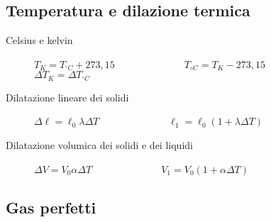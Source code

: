 \documentclass[a4paper,11pt,italian]{article}
\begin{document}
\subsection{Temperatura e dilazione termica}

\begin{description}
  \item[Celsius e kelvin] $ T_K = T_{^{\circ}C} + 273,15 $~~~~~~~~~~~~~~$ T_{{\circ}C} = T_{K} - 273,15 $~~~~~~~~~~~~~~$ \Delta T_K = \Delta T_{^{\circ}C} $
  
  \item[Dilatazione lineare dei solidi] $ \Delta \ell = \ell_0 \lambda \Delta T $~~~~~~~~~~~~~~$ \ell_1 = \ell_0 (1 + \lambda \Delta T) $
  
  \item[Dilatazione volumica dei solidi e dei liquidi] $ \Delta V = V_0 \alpha \Delta T $~~~~~~~~~~~~~~$ V_1 = V_0 (1 + \alpha \Delta T) $
\end{description}

\subsection{Gas perfetti}
\end{document}
